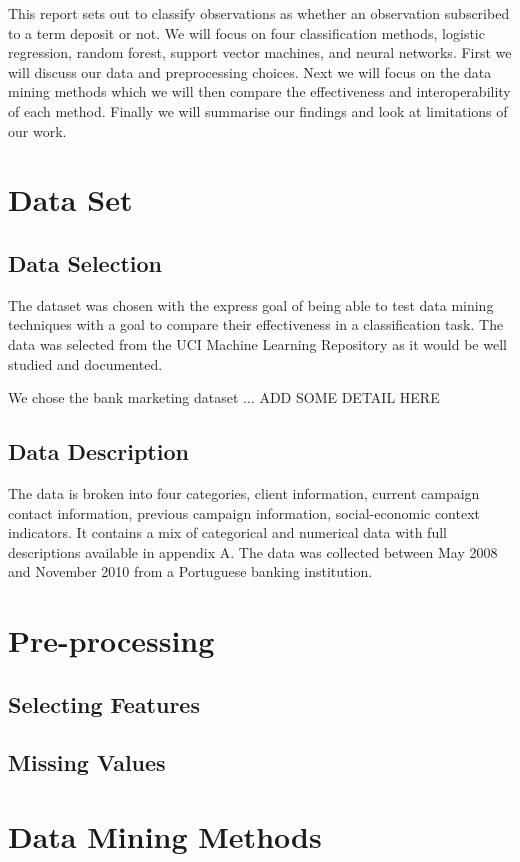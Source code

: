 \documentclass[a4paper, oneside, 11pt]{article}
\begin{document}
This report sets out to classify observations as whether an observation subscribed to a term deposit or not. We will focus on four classification methods, logistic regression, random forest, support vector machines, and neural networks. First we will discuss our data and preprocessing choices. Next we will focus on the data mining methods which we will then compare the effectiveness and interoperability of each method. Finally we will summarise our findings and look at limitations of our work.  


\section{Data Set}
\subsection{Data Selection}
The dataset was chosen with the express goal of being able to test data mining techniques with a goal to compare their effectiveness in a classification task. The data was selected from the UCI Machine Learning Repository as it would be well studied and documented.

We chose the bank marketing dataset ... ADD SOME DETAIL HERE

\subsection{Data Description}
The data is broken into four categories, client information, current campaign contact information, previous campaign information, social-economic context indicators. It contains a mix of categorical and numerical data with full descriptions available in appendix A. The data was collected between May 2008 and November 2010 from a Portuguese banking institution.

\section{Pre-processing}
\subsection{Selecting Features}

\subsection{Missing Values}

\section{Data Mining Methods}
\end{document}
